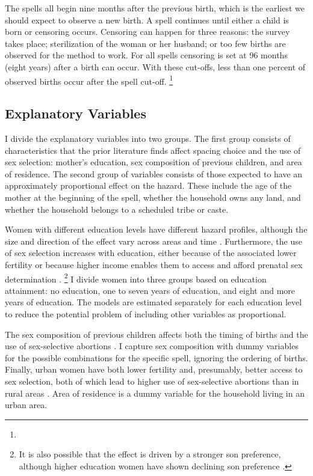 \documentclass[12pt,letterpaper]{article}
\begin{document}
The spells all begin nine months after the previous birth, which is the earliest we should 
expect to observe a new birth.
A spell continues until either a child is born or censoring occurs.
Censoring can happen for three reasons:
the survey takes place;
sterilization of the woman or her husband;
or too few births are observed for the method to work.
For all spells censoring is set at 96 months (eight years) after a birth can occur.
With these cut-offs, less than one percent of observed births occur after
the spell cut-off.%
\footnote{

}


\subsection{Explanatory Variables}

I divide the explanatory variables into two groups.
The first group consists of characteristics that the prior literature finds affect 
spacing choice and the use of sex selection:
mother's education, sex composition of previous children, and area of residence.
The second group of variables consists of those expected to have an approximately 
proportional effect on the hazard.
These include the age of the mother at the beginning of the spell, whether the household 
owns any land, and whether the household belongs to a scheduled tribe or caste.

Women with different education levels have different hazard profiles, although the size 
and direction of the effect vary across areas and time 
\citep{Tulasidhar1993,Whitworth2002,Bhalotra2008,Kim2010,Soest2018}.
Furthermore, the use of sex selection increases with education, either because of the 
associated lower fertility or because higher income enables them to access and
afford prenatal sex determination
\citep{das_gupta97,retherford03b,jha06,Guilmoto2009a,Bongaarts2013,Portner2015b,Jayachandran2017}.%
\footnote{
It is also possible that the effect is driven by a stronger son preference, although 
higher education women have shown declining son preference \citep{bhat03,pande07}.
}
I divide women into three groups based on education attainment: no
education, one to seven years of education, and eight and more years of education.
The models are estimated separately for each education level to reduce the potential 
problem of including other variables as proportional.

The sex composition of previous children affects both the timing of births and the use of 
sex-selective abortions 
\citep{retherford03b,jha06,Bhalotra2008,abrevaya09,Portner2015b,Kumar2016,Soest2018}.
I capture sex composition with dummy variables for the
possible combinations for the specific spell, ignoring the ordering of births.
Finally, urban women have both lower fertility and, presumably, better access to
sex selection, both of which lead to higher use of sex-selective abortions than in 
rural areas \citep{retherford03b,jha06,Portner2015b}.
Area of residence is a dummy variable for the household living in an urban area.
\end{document}

